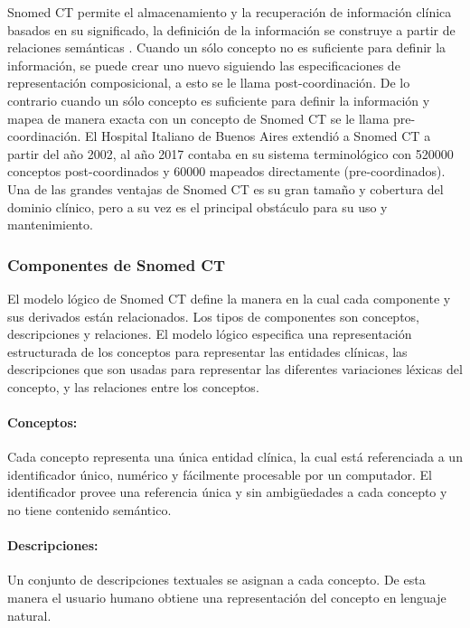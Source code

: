 Snomed CT permite el almacenamiento y la recuperación de información clínica basados en su significado, la definición de la información se construye a partir de relaciones semánticas \cite{Rector,Bhattacharyya2016,ihtsdo2016SG}. Cuando un sólo concepto no es suficiente para definir la información, se puede crear uno nuevo siguiendo las especificaciones de representación composicional, a esto se le llama post-coordinación. De lo contrario cuando un sólo concepto es suficiente para definir la información y mapea de manera exacta con un concepto de Snomed CT se le llama pre-coordinación. El Hospital Italiano de Buenos Aires extendió a Snomed CT a partir del año 2002, al año \num{2017} contaba en su sistema terminológico con \num{520000} conceptos post-coordinados y \num{60000} mapeados directamente (pre-coordinados). Una de las grandes ventajas de Snomed CT es su gran tamaño y cobertura del dominio clínico, pero a su vez es el principal obstáculo para su uso y mantenimiento.

\subsubsection{Componentes de Snomed CT}
El modelo lógico de Snomed CT define la manera en la cual cada componente  y sus derivados están relacionados. Los tipos de componentes son conceptos, descripciones y relaciones. El modelo lógico especifica una representación estructurada de los conceptos para representar las entidades clínicas, las descripciones  que son usadas para representar las diferentes variaciones léxicas del concepto, y las relaciones entre los conceptos.\cite{ihtsdo2016SG}

\paragraph{Conceptos:}
Cada concepto representa una única entidad clínica, la cual está referenciada a un identificador único, numérico y fácilmente procesable por un computador. El identificador provee una referencia única y sin ambigüedades a cada concepto y no tiene contenido semántico.\cite{ihtsdo2016SG}

\paragraph{Descripciones:}
Un conjunto de descripciones textuales se asignan a cada concepto. De esta manera el usuario humano obtiene una representación del concepto en lenguaje natural.

